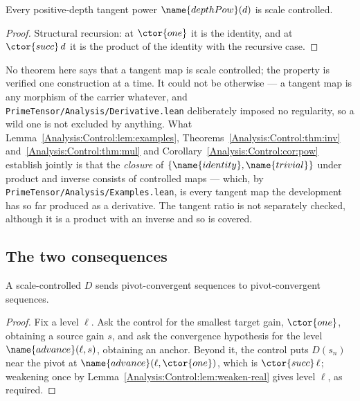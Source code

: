 \begin{corollary}
\label{Analysis:Control:cor:pow}
Every positive-depth tangent power $\name{depthPow}(d)$ is scale controlled.
\end{corollary}

\begin{proof}
Structural recursion: at $\ctor{one}$ it is the identity, and at
$\ctor{succ}\,d$ it is the product of the identity with the recursive case.
\end{proof}

\begin{remark}
\label{Analysis:Control:rem:not-all}
No theorem here says that a tangent map is scale controlled; the property is
verified one construction at a time.  It could not be otherwise --- a tangent
map is any morphism of the carrier whatever, and
\texttt{PrimeTensor/Analysis/Derivative.lean} deliberately imposed no
regularity, so a wild one is not excluded by anything.  What
Lemma~\ref{Analysis:Control:lem:examples},
Theorems~\ref{Analysis:Control:thm:inv} and~\ref{Analysis:Control:thm:mul} and
Corollary~\ref{Analysis:Control:cor:pow} establish jointly is that the
\emph{closure} of $\{\name{identity}, \name{trivial}\}$ under product and
inverse consists of controlled maps --- which, by
\texttt{PrimeTensor/Analysis/Examples.lean}, is every tangent map the
development has so far produced as a derivative.  The tangent ratio is not
separately checked, although it is a product with an inverse and so is covered.
\end{remark}

\subsection{The two consequences}

\begin{theorem}
\label{Analysis:Control:thm:converges}
A scale-controlled $D$ sends pivot-convergent sequences to pivot-convergent
sequences.
\end{theorem}

\begin{proof}
Fix a level $\ell$.  Ask the control for the smallest target gain,
$\ctor{one}$, obtaining a source gain $s$, and ask the convergence hypothesis
for the level $\name{advance}(\ell, s)$, obtaining an anchor.  Beyond it, the
control puts $D(s_n)$ near the pivot at $\name{advance}(\ell, \ctor{one})$,
which is $\ctor{succ}\,\ell$; weakening once by
Lemma~\ref{Analysis:Control:lem:weaken-real} gives level $\ell$, as required.
\end{proof}


